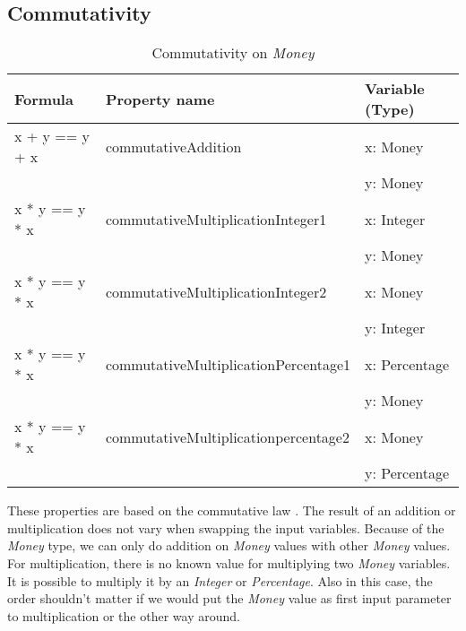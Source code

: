 \subsection*{Commutativity}
\label{ssct:4_commutativity}
\FloatBarrier
\begin{table}[!ht]
\centering
\begin{tabular}{lll}
\hline
                        \textbf{Formula} & \textbf{Property name}               & \textbf{Variable (Type)} \\ \hline
\rowcolor[HTML]{EFEFEF} x + y == y + x   & commutativeAddition                  & x: Money                 \\
\rowcolor[HTML]{EFEFEF}                  &                                      & y: Money                 \\
                        x * y == y * x   & commutativeMultiplicationInteger1    & x: Integer               \\
                                         &                                      & y: Money                 \\
\rowcolor[HTML]{EFEFEF} x * y == y * x   & commutativeMultiplicationInteger2    & x: Money                 \\
\rowcolor[HTML]{EFEFEF}                  &                                      & y: Integer               \\
                        x * y == y * x   & commutativeMultiplicationPercentage1 & x: Percentage            \\
                                         &                                      & y: Money                 \\
\rowcolor[HTML]{EFEFEF} x * y == y * x   & commutativeMultiplicationpercentage2 & x: Money                 \\
\rowcolor[HTML]{EFEFEF}                  &                                      & y: Percentage            \\ \hline
\end{tabular}
\caption{Commutativity on \textit{Money}}
\label{tbl:ch4_money_commutativity}
\end{table}
\FloatBarrier
These properties are based on the commutative law \cite{baumgart1961axioms}. The result of an addition or multiplication does not vary when swapping the input variables. Because of the \textit{Money} type, we can only do addition on \textit{Money} values with other \textit{Money} values. For multiplication, there is no known value for multiplying two \textit{Money} variables. It is possible to multiply it by an \textit{Integer} or \textit{Percentage}. Also in this case, the order shouldn't matter if we would put the \textit{Money} value as first input parameter to multiplication or the other way around.

